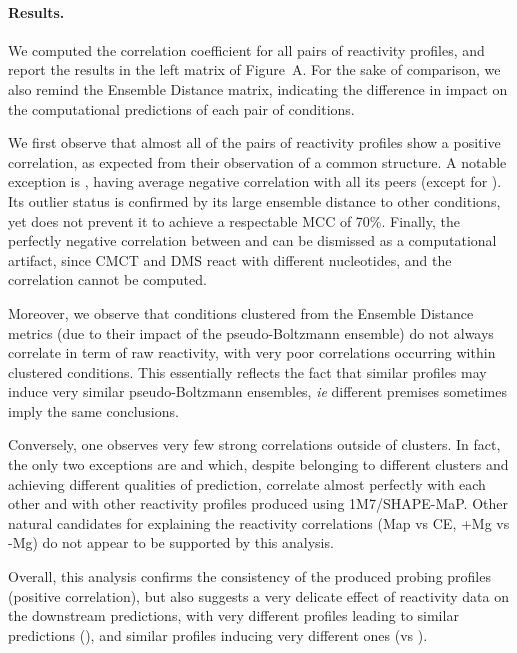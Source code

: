 \documentclass[9pt,hyperref]{article} %
\begin{document}
\begin{enumerate}
{{			\paragraph{Results.} We computed the correlation coefficient for all pairs of reactivity profiles, and report the results in the left matrix of Figure~A. For the sake of comparison, we also remind the Ensemble Distance matrix, indicating the difference in impact on the computational predictions of each pair of conditions.
			
			We first observe that almost all of the pairs of reactivity profiles show a positive correlation, as expected from their observation of a common structure. A notable exception is \OneMSevMgCE, having average negative correlation with all its peers (except for \NMIAMgCE). Its outlier status is confirmed by its large ensemble distance to other conditions, yet does not prevent it to achieve a respectable MCC of 70\%. Finally, the perfectly negative correlation between \CMCTMg{} and \DMSMg{} can be dismissed as a computational artifact, since CMCT and DMS react with different nucleotides, and the correlation cannot be computed.
			
			Moreover, we observe that conditions clustered from the Ensemble Distance metrics (due to their impact of the pseudo-Boltzmann ensemble) do not always correlate in term of raw reactivity, with very poor correlations occurring within clustered conditions. This essentially reflects the fact that similar profiles may induce very similar pseudo-Boltzmann ensembles, \emph{ie} different premises sometimes imply the same conclusions. 
			
			Conversely, one observes very few strong correlations outside of clusters. In fact, the only two exceptions are \OneMSevILU and \OneMSevILUThree which, despite belonging to different clusters and achieving different qualities of prediction, correlate almost perfectly with each other and with other reactivity profiles produced using 1M7/SHAPE-MaP. Other natural candidates for explaining the reactivity correlations (Map vs CE, +Mg vs -Mg) do not appear to be supported by this analysis.
			
			Overall, this analysis confirms the consistency of the produced probing profiles (positive correlation), but also suggests a very delicate effect of reactivity data on the downstream predictions, with very different profiles leading to similar predictions (\OneMSevILU), and similar profiles inducing very different ones (\OneMSevILU vs \OneMSevILUThree).}
		
}
\end{enumerate}
\end{document}
